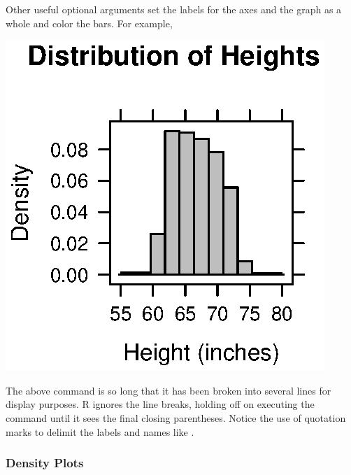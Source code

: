 Other useful optional arguments set the labels for the axes and the
graph as a whole and color the bars.  For example,
\begin{Schunk}
\end{Schunk}
\includegraphics{Figures/variation-var4-hist}

The above command is so long that it has been broken into several
lines for display purposes.  R ignores the line breaks, holding off on
executing the command until it sees the final closing parentheses.
Notice the use of quotation marks to delimit the labels and names like
.

\subsubsection{Density Plots}


